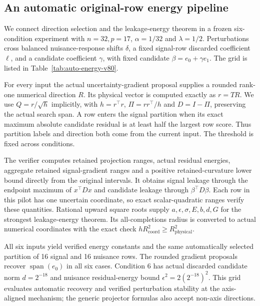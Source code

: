 \subsection{An automatic original-row energy pipeline}\label{app:auto-energy-v80}
We connect direction selection and the leakage-energy theorem in a frozen six-condition experiment with $n=32,p=17$, $\alpha=1/32$ and $\lambda=1/2$. Perturbations cross balanced nuisance-response shifts $\delta$, a fixed signal-row discarded coefficient $\ell$, and a candidate coefficient $\gamma$, with fixed candidate $\beta=e_0+\gamma e_1$. The grid is listed in Table~\ref{tab:auto-energy-v80}.

For every input the actual uncertainty-gradient proposal supplies a rounded rank-one numerical direction $R$. Its physical vector is computed exactly as $r=TR$. We use $Q=r/\sqrt{h}$ implicitly, with $h=r^\top r$, $\Pi=rr^\top/h$ and $D=I-\Pi$, preserving the actual search span. A row enters the signal partition when its exact maximum absolute candidate residual is at least half the largest row score. Thus partition labels and direction both come from the current input. The threshold is fixed across conditions.

The verifier computes retained projection ranges, actual residual energies, aggregate retained signal-gradient ranges and a positive retained-curvature lower bound directly from the original intervals. It obtains signal leakage through the endpoint maximum of $x^\top Dx$ and candidate leakage through $\beta^\top D\beta$. Each row in this pilot has one uncertain coordinate, so exact scalar-quadratic ranges verify these quantities. Rational upward square roots supply $a,\epsilon,\sigma,E,b,d,G$ for the strongest leakage-energy theorem. Its all-completions radius is converted to actual numerical coordinates with the exact check $hR_{\mathrm{coord}}^2\geq R_{\mathrm{physical}}^2$.

All six inputs yield verified energy constants and the same automatically selected partition of 16 signal and 16 nuisance rows. The rounded gradient proposals recover $\operatorname{span}(e_0)$ in all six cases. Condition 6 has actual discarded candidate norm $d=2^{-18}$ and nuisance residual-energy bound $\epsilon^2=2(2^{-18})^2$. This grid evaluates automatic recovery and verified perturbation stability at the axis-aligned mechanism; the generic projector formulas also accept non-axis directions.

